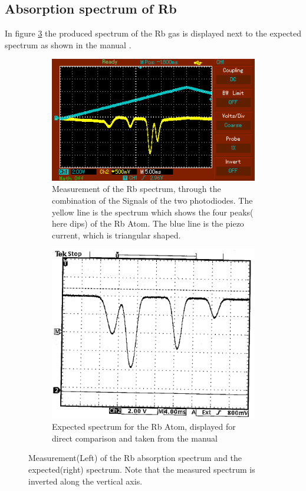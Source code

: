 \subsection{Absorption spectrum of Rb}
In figure \ref{fig:spectrum} the produced spectrum of the Rb gas is displayed next to the expected spectrum as shown in the manual \cite{sample}.
\begin{figure}
    \centering
    \begin{subfigure}{.5\textwidth}
      \centering
      \includegraphics[width=0.9\linewidth]{Bilder/V60_Bilder/spectrum.png}
      \caption{ Measurement of the Rb spectrum, through the combination of the Signals of the two photodiodes. The yellow line is the spectrum which shows the four peaks( here dips) of the Rb Atom. The blue line is the piezo current, which is triangular shaped.    }
      \label{fig:sub1}
    \end{subfigure}%
    \begin{subfigure}{.5\textwidth}
      \centering
      \includegraphics[width=.9\linewidth]{Bilder/exp_spectrum.png}
      \caption{Expected spectrum for the Rb Atom, displayed for direct comparison and taken from the manual \cite{sample} }
      \label{fig:sub2}
    \end{subfigure}
    \caption{ Measurement(Left) of the Rb absorption spectrum and the expected(right) spectrum. Note that the measured spectrum is inverted along the vertical axis. }
    \label{fig:spectrum}
 \end{figure}
